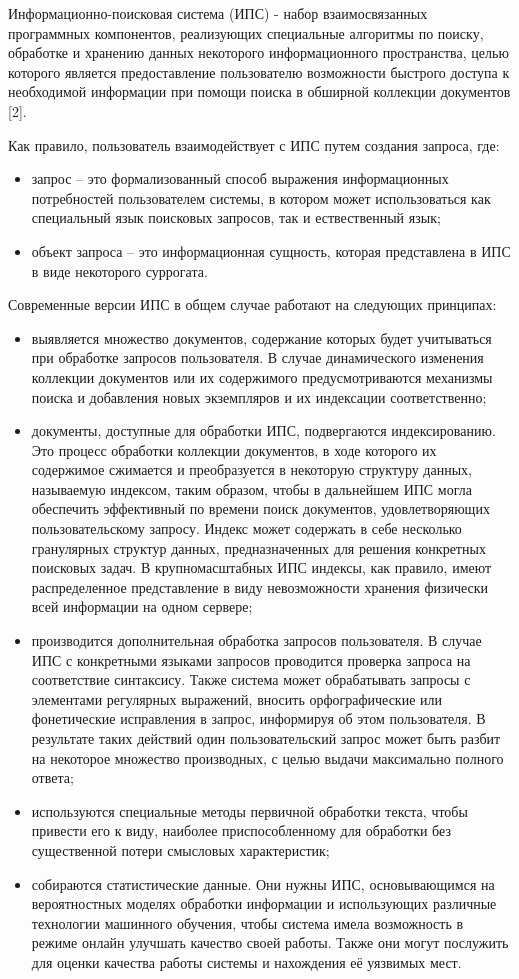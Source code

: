 Информационно-поисковая система (ИПС) - набор взаимосвязанных программных компонентов, реализующих специальные алгоритмы по поиску, обработке и хранению данных некоторого информационного пространства, целью которого является предоставление пользователю возможности быстрого доступа к необходимой информации при помощи поиска в обширной коллекции документов [2].

Как правило, пользователь взаимодействует с ИПС путем создания запроса, где:
\begin{itemize}
\item запрос -- это формализованный способ выражения информационных потребностей пользователем системы, в котором может использоваться как специальный язык поисковых запросов, так и ествественный язык;
\item объект запроса -- это информационная сущность, которая представлена в ИПС в виде некоторого суррогата.
\end{itemize}

Современные версии ИПС в общем случае работают на следующих принципах:
\begin{itemize}
\item выявляется множество документов, содержание которых будет учитываться при обработке запросов пользователя. В случае динамического изменения коллекции документов или их содержимого предусмотриваются механизмы поиска и добавления новых экземпляров и их индексации соответственно;
\item документы, доступные для обработки ИПС, подвергаются индексированию. Это процесс обработки коллекции документов, в ходе которого их содержимое сжимается и преобразуется в некоторую структуру данных, называемую индексом, таким образом, чтобы в дальнейшем ИПС могла обеспечить эффективный по времени поиск документов, удовлетворяющих пользовательскому запросу. Индекс может содержать в себе несколько гранулярных структур данных, предназначенных для решения конкретных поисковых задач. В крупномасштабных ИПС индексы, как правило, имеют распределенное представление в виду невозможности хранения физически всей информации на одном сервере;
\item производится дополнительная обработка запросов пользователя. В случае ИПС с конкретными языками запросов проводится проверка запроса на соответствие синтаксису. Также система может обрабатывать запросы с элементами регулярных выражений, вносить орфографические или фонетические исправления в запрос, информируя об этом пользователя. В результате таких действий один пользовательский запрос может быть разбит на некоторое множество производных, с целью выдачи максимально полного ответа;
\item используются специальные методы первичной обработки текста, чтобы привести его к виду, наиболее приспособленному для обработки без существенной потери смысловых характеристик;
\item собираются статистические данные. Они нужны ИПС, основывающимся на вероятностных моделях обработки информации и использующих различные технологии машинного обучения, чтобы система имела возможность в режиме онлайн улучшать качество своей работы. Также они могут послужить для оценки качества работы системы и нахождения её уязвимых мест.
\end{itemize}

